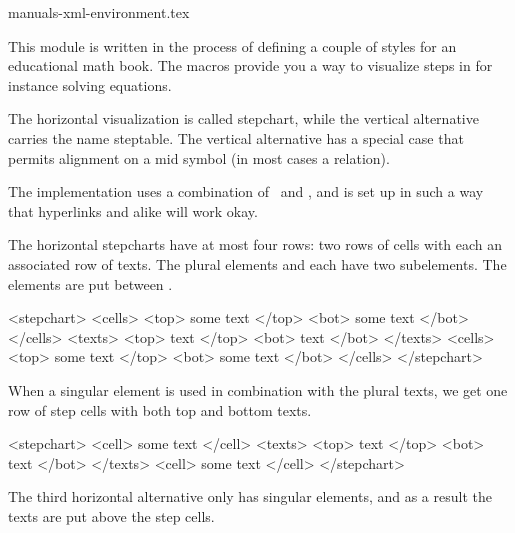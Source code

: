 \environment manuals-xml-environment.tex

\useMPlibrary [ove]

\usemodule[x][mathml]
\usemodule[m][steps]

\startdocument[title=Steps,author=Hans Hagen,palet=steps]

\startbuffer
\startSTEPchart
{}
   
   
 
  
\stopSTEPchart
\stopbuffer

\startsection[title=Description]

This module is written in the process of defining a couple of styles for an
educational math book. The macros provide you a way to visualize steps in for
instance solving equations.

The horizontal visualization is called stepchart, while the vertical alternative
carries the name steptable. The vertical alternative has a special case that
permits alignment on a mid symbol (in most cases a relation).

The implementation uses a combination of \TEX\ and \METAPOST, and is set up in
such a way that hyperlinks and alike will work okay.

\stopsection

\startsection[title=Structure]

The horizontal stepcharts have at most four rows: two rows of cells with each an
associated row of texts. The plural elements  and  each
have two subelements. The  elements are put between .

\startbuffer
<stepchart>
  <cells> <top> some text </top> <bot> some text </bot> </cells>
  <texts> <top> text </top> <bot> text </bot> </texts>
  <cells> <top> some text </top> <bot> some text </bot> </cells>
</stepchart>
\stopbuffer

\typebuffer \processxmlbuffer

When a singular  element is used in combination with the plural \type
{texts}, we get one row of step cells with both top and bottom texts.

\startbuffer
<stepchart>
  <cell> some text </cell>
  <texts> <top> text </top> <bot> text </bot> </texts>
  <cell> some text </cell>
</stepchart>
\stopbuffer

\typebuffer \processxmlbuffer

The third horizontal alternative only has singular elements, and as a result the
texts are put above the step cells.

